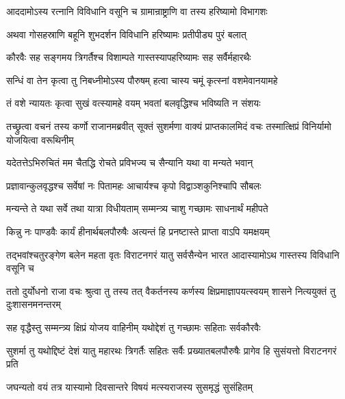 \twolineshloka
{आददामोऽस्य रत्नानि विविधानि वसूनि च}
{ग्रामान्राष्ट्राणि वा तस्य हरिष्यामो विभागशः}


\twolineshloka
{अथवा गोसहस्राणि बहूनि शुभदर्शन}
{विविधानि हरिष्यामः प्रतीपीड्य पुरं बलात्}


\twolineshloka
{कौरवैः सह सङ्गमय त्रिगर्तैश्च विशाम्पते}
{गास्तस्यापहरिष्यामः सह सर्वैर्महारथैः}


\twolineshloka
{सन्धिं वा तेन कृत्वा तु निबध्नीमोऽस्य पौरुषम्}
{हत्वा चास्य चमूं कृत्स्नां वशमेवानयामहे}


\twolineshloka
{तं वशे न्यायतः कृत्वा सुखं वत्स्यामहे वयम्}
{भवतां बलवृद्धिश्च भविष्यति न संशयः}



\onelineshloka
{तच्छ्रुत्वा वचनं तस्य कर्णो राजानमब्रवीत्}
\twolineshloka
{सूक्तं सुशर्मणा वाक्यं प्राप्तकालमिदं वचः}
{तस्मात्क्षिप्रं विनिर्यामो योजयित्वा वरूथिनीम्}


\twolineshloka
{यदेतत्तेऽभिरुचितं मम चैतद्धि रोचते}
{प्रविभज्य च सैन्यानि यथा वा मन्यते भवान्}





\twolineshloka
{प्रज्ञावान्कुलवृद्धश्च सर्वेषां नः पितामहः}
{आचार्यश्च कृपो विद्वाञ्शकुनिश्चापि सौबलः}


\twolineshloka
{मन्यन्ते ते यथा सर्वे तथा यात्रा विधीयताम्}
{सम्मन्त्र्य चाशु गच्छामः साधनार्थं महीपते}


\twolineshloka
{किन्नु नः पाण्डवैः कार्यं हीनार्थबलपौरुषैः}
{अत्यन्तं हि प्रनष्टास्ते प्राप्ता वाऽपि यमक्षयम्}


\threelineshloka
{तद्भवांश्चतुरङ्गेण बलेन महता वृतः}
{विराटनगरं यातु सर्वसैन्येन भारत}
{आदास्यामोऽथ गास्तस्य विविधानि वसूनि च}



\threelineshloka
{ततो दुर्योधनो राजा वचः श्रुत्वा तु तस्य तत्}
{वैकर्तनस्य कर्णस्य क्षिप्रमाज्ञापयत्स्वयम्}
{शासने नित्ययुक्तं तु दुःशासनमनन्तरम्}




\twolineshloka
{सह वृद्धैस्तु सम्मन्त्र्य क्षिप्रं योजय वाहिनीम्}
{यथोद्देशं तु गच्छामः सहिताः सर्वकौरवैः}


\threelineshloka
{सुशर्मा तु यथोद्दिष्टं देशं यातु महारथः}
{त्रिगर्तैः सहितः सर्वैः प्रख्यातबलपौरुषैः}
{प्रागेव हि सुसंयत्तो विराटनगरं प्रति}


\twolineshloka
{जघन्यतो वयं तत्र यास्यामो दिवसान्तरे}
{विषयं मत्स्यराजस्य सुसमृद्धं सुसंहितम्}


